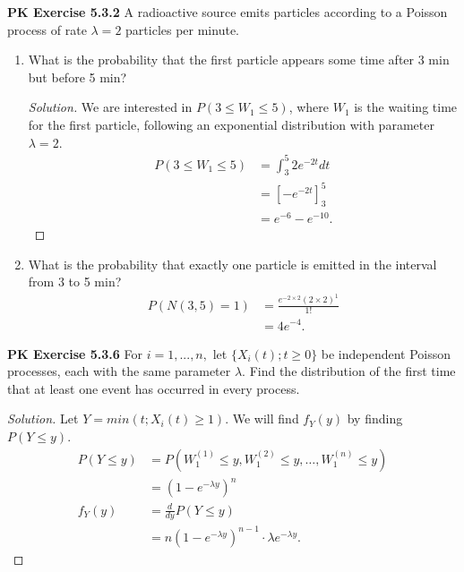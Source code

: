 \documentclass{article}
\begin{document}
\textbf{PK Exercise 5.3.2}
A radioactive source emits particles according to a Poisson process of rate $\lambda=2$ particles per minute.
\begin{enumerate}[label=(\alph*)]
    \item 
    What is the probability that the first particle appears some time after 3 min but before 5 min?
    \begin{proof}[Solution]
        We are interested in $P(3\le W_1\le 5)$, where $W_1$ is the waiting time for the first particle, following an exponential distribution with parameter $\lambda = 2$.
        \begin{align*}
            P(3\le W_1\le 5) & = \int_{3}^{5} 2e^{-2t}dt \\
            & = \left[-e^{-2t}\right]_{3}^{5} \\
            & = e^{-6} - e^{-10}.
        \end{align*}
    \end{proof}

    \item 
    What is the probability that exactly one particle is emitted in the interval from 3 to 5 min?
    \begin{align*}
        P(N(3,5) = 1) & = \frac{e^{-2\times 2}(2\times 2)^1}{1!} \\
        & = 4e^{-4}.
    \end{align*}
\end{enumerate}
\bigbreak

\textbf{PK Exercise 5.3.6}
For $i = 1,...,n,$ let $\{X_i(t);t \ge 0\}$ be independent Poisson processes, 
each with the same parameter $\lambda$. 
Find the distribution of the first time that at least one event has occurred in every process.
\begin{proof}[Solution]
    Let $Y = min(t;X_i(t)\ge 1)$. 
    We will find $f_Y(y)$ by finding $P(Y\le y)$.
    \begin{align*}
        P(Y\le y) & = P(W^{(1)}_1\le y, W^{(2)}_1\le y, \dots, W^{(n)}_1\le y) \\
        & = (1-e^{-\lambda y})^n \\
        f_Y(y) & = \frac{d}{dy}P(Y\le y) \\
        & = n(1-e^{-\lambda y})^{n-1}\cdot \lambda e^{-\lambda y}.
    \end{align*}
\end{proof}
\bigbreak
\end{document}
